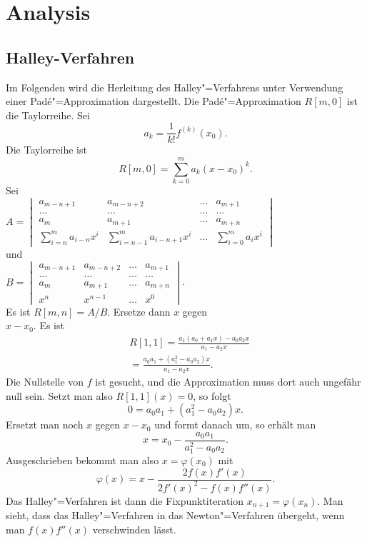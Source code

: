 \documentclass[a4paper,10pt,fleqn,twocolumn,twoside]{article}
\numberwithin{equation}{section}
\begin{document}
\newpage
\section{Analysis}
\subsection{Halley-Verfahren}
Im Folgenden wird die Herleitung des Halley"=Verfahrens unter
Verwendung einer Padé"=Approximation dargestellt.
Die Padé"=Approximation \(R[m,0]\) ist die Taylorreihe. Sei
\begin{equation}
a_k = \frac{1}{k!} f^{(k)}(x_0).
\end{equation}
Die Taylorreihe ist
\begin{equation}
R[m,0] = \sum_{k=0}^m a_k(x-x_0)^k.
\end{equation}
Sei\\
\(A=\begin{vmatrix}
a_{m-n+1} & a_{m-n+2} & \ldots & a_{m+1}\\
\ldots & \ldots & \ldots & \ldots\\
a_m & a_{m+1} & \ldots & a_{m+n}\\
\sum\limits_{i=n}^m a_{i-n}x^i &
\sum\limits_{i=n-1}^m a_{i-n+1}x^i
&\ldots & \sum\limits_{i=0}^m a_i x^i
\end{vmatrix}\)\\
und\\
\(B=\begin{vmatrix}
a_{m-n+1} & a_{m-n+2} & \ldots & a_{m+1}\\
\ldots &\ldots &\ldots &\ldots\\
a_m & a_{m+1} &\ldots & a_{m+n}\\
x^n & x^{n-1} &\ldots & x^0
\end{vmatrix}\).\\
Es ist \(R[m,n]=A/B\).
Ersetze dann \(x\) gegen\\
\(x-x_0\). Es ist
\begin{equation}
\begin{split}
& R[1,1] = \frac{a_1(a_0+a_1 x)-a_0a_2x}{a_1-a_2x}\\
& = \frac{a_0a_1+(a_1^2-a_0a_2)x}{a_1-a_2x}.
\end{split}
\end{equation}
Die Nullstelle von \(f\) ist gesucht, und die Approximation
muss dort auch ungefähr null sein. Setzt man also \(R[1,1](x)=0\),
so folgt
\begin{equation}
0=a_0a_1+(a_1^2-a_0a_2)x.
\end{equation}
Ersetzt man noch \(x\) gegen \(x-x_0\) und formt danach um,
so erhält man
\begin{equation}
x=x_0-\frac{a_0a_1}{a_1^2-a_0a_2}.
\end{equation}
Ausgeschrieben bekommt man also \(x=\varphi(x_0)\) mit
\begin{equation}
\varphi(x) = x-\frac{2f(x)f'(x)}{2f'(x)^2-f(x)f''(x)}.
\end{equation}
Das Halley"=Verfahren ist dann die Fixpunktiteration
\(x_{n+1}=\varphi(x_n)\).
Man sieht, dass das Halley"=Verfahren in das Newton"=Verfahren
übergeht, wenn man \(f(x)f''(x)\) verschwinden lässt.
\end{document}
